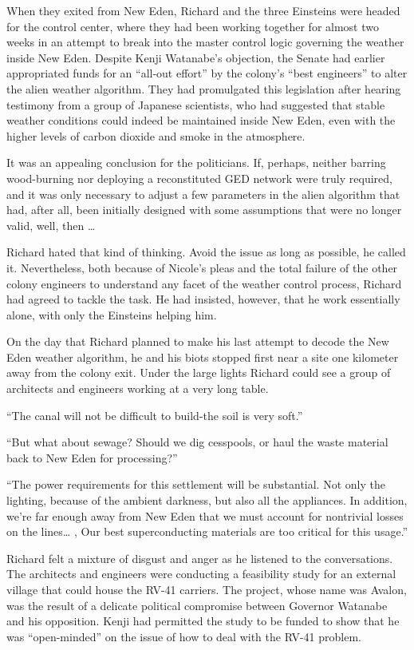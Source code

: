 \documentclass[]{article}
\begin{document}
{When they exited from New Eden, Richard and the three Einsteins were headed for the control center, where they had been working together for almost two weeks in an attempt to break into the master control logic governing the weather inside New Eden. Despite Kenji Watanabe’s objection, the Senate had earlier appropriated funds for an “all-out effort” by the colony’s “best engineers” to alter the alien weather algorithm. They had promulgated this legislation after hearing testimony from a group of Japanese scientists, who had suggested that stable weather conditions could indeed be maintained inside New Eden, even with the higher levels of carbon dioxide and smoke in the atmosphere.

It was an appealing conclusion for the politicians. If, perhaps, neither barring wood-burning nor deploying a reconstituted GED network were truly required, and it was only necessary to adjust a few parameters in the alien algorithm that had, after all, been initially designed with some assumptions that were no longer valid, well, then …

Richard hated that kind of thinking. Avoid the issue as long as possible, he called it. Nevertheless, both because of Nicole’s pleas and the total failure of the other colony engineers to understand any facet of the weather control process, Richard had agreed to tackle the task. He had insisted, however, that he work essentially alone, with only the Einsteins helping him.

On the day that Richard planned to make his last attempt to decode the New Eden weather algorithm, he and his biots stopped first near a site one kilometer away from the colony exit. Under the large lights Richard could see a group of architects and engineers working at a very long table.

“The canal will not be difficult to build-the soil is very soft.”

“But what about sewage? Should we dig cesspools, or haul the waste material back to New Eden for processing?”

“The power requirements for this settlement will be substantial. Not only the lighting, because of the ambient darkness, but also all the appliances. In addition, we’re far enough away from New Eden that we must account for nontrivial losses on the lines… , Our best superconducting materials are too critical for this usage.”

Richard felt a mixture of disgust and anger as he listened to the conversations. The architects and engineers were conducting a feasibility study for an external village that could house the RV-41 carriers. The project, whose name was Avalon, was the result of a delicate political compromise between Governor Watanabe and his opposition. Kenji had permitted the study to be funded to show that he was “open-minded” on the issue of how to deal with the RV-41 problem.

}
\end{document}
